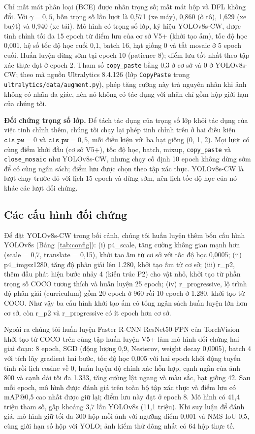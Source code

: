 \documentclass[10pt,journal,a4paper]{IEEEtran}
\newcommand{\clspw}{\texttt{cls\_pw}}
\begin{document}
Chỉ mất mát phân loại (BCE) được nhân trọng số; mất mát hộp và DFL không đổi. Với $\gamma = 0{,}5$, bốn trọng số lần lượt là 0,571 (xe máy), 0,860 (ô tô), 1,629 (xe buýt) và 0,940 (xe tải). Mô hình có trọng số lớp, ký hiệu YOLOv8s-CW, được tinh chỉnh tối đa 15 epoch từ điểm lưu của cơ sở V5+ (khởi tạo ấm), tốc độ học 0,001, hệ số tốc độ học cuối 0,1, batch 16, hạt giống 0 và tắt mosaic ở 5 epoch cuối. Huấn luyện dừng sớm tại epoch 10 (patience 8); điểm lưu tốt nhất theo tập xác thực đạt ở epoch 2. Tham số \texttt{copy\_paste} bằng 0,3 ở cơ sở và 0 ở YOLOv8s-CW; theo mã nguồn Ultralytics 8.4.126 (lớp \texttt{CopyPaste} trong \texttt{ultralytics/data/augment.py}), phép tăng cường này trả nguyên nhãn khi ảnh không có nhãn đa giác, nên nó không có tác dụng với nhãn chỉ gồm hộp giới hạn của chúng tôi.

\textbf{Đối chứng trọng số lớp.} Để tách tác dụng của trọng số lớp khỏi tác dụng của việc tinh chỉnh thêm, chúng tôi chạy lại phép tinh chỉnh trên ở hai điều kiện $\clspw = 0$ và $\clspw = 0{,}5$, mỗi điều kiện với ba hạt giống (0, 1, 2). Mọi lượt có cùng điểm khởi đầu (cơ sở V5+), tốc độ học, batch, mixup, \texttt{copy\_paste} và \texttt{close\_mosaic} như YOLOv8s-CW, nhưng chạy cố định 10 epoch không dừng sớm để có cùng ngân sách; điểm lưu được chọn theo tập xác thực. YOLOv8s-CW là lượt chạy trước đó với lịch 15 epoch và dừng sớm, nên lịch tốc độ học của nó khác các lượt đối chứng.

\subsection{Các cấu hình đối chứng}
Để đặt YOLOv8s-CW trong bối cảnh, chúng tôi huấn luyện thêm bốn cấu hình YOLOv8s (Bảng~\ref{tab:config}): (i) p4\_scale, tăng cường không gian mạnh hơn (scale = 0,7, translate = 0,15), khởi tạo ấm từ cơ sở với tốc độ học 0,0005; (ii) p4\_imgsz1280, tăng độ phân giải lên 1.280, khởi tạo ấm từ cơ sở; (iii) r\_p2, thêm đầu phát hiện bước nhảy 4 (kiến trúc P2) cho vật nhỏ, khởi tạo từ phần trọng số COCO tương thích và huấn luyện 25 epoch; (iv) r\_progressive, lộ trình độ phân giải (curriculum) gồm 20 epoch ở 960 rồi 10 epoch ở 1.280, khởi tạo từ COCO. Như vậy ba cấu hình khởi tạo ấm có tổng ngân sách huấn luyện lớn hơn cơ sở, còn r\_p2 và r\_progressive có ít epoch hơn cơ sở.

Ngoài ra chúng tôi huấn luyện Faster R-CNN ResNet50-FPN của TorchVision~\cite{tv} khởi tạo từ COCO trên cùng tập huấn luyện V5+ làm mô hình đối chứng hai giai đoạn: 8 epoch, SGD (động lượng 0,9, Nesterov, weight decay 0,0005), batch 4 với tích lũy gradient hai bước, tốc độ học 0,005 với hai epoch khởi động tuyến tính rồi lịch cosine về 0, huấn luyện độ chính xác hỗn hợp, cạnh ngắn của ảnh 800 và cạnh dài tối đa 1.333, tăng cường lật ngang và màu sắc, hạt giống 42. Sau mỗi epoch, mô hình được đánh giá trên toàn bộ tập xác thực và điểm lưu có mAP@0,5 cao nhất được giữ lại; điểm lưu này đạt ở epoch 8. Mô hình có 41,4 triệu tham số, gấp khoảng 3,7 lần YOLOv8s (11,1 triệu). Khi suy luận để đánh giá, mô hình giữ tối đa 300 hộp mỗi ảnh với ngưỡng điểm 0,001 và NMS IoU 0,5, cùng giới hạn số hộp với YOLO; ảnh kiểm thử đông nhất có 64 hộp thực tế.
\end{document}
